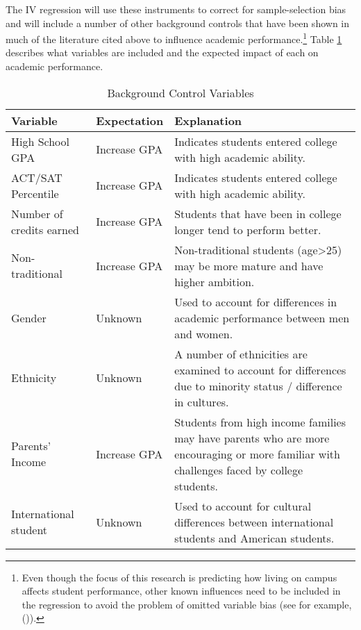 \documentclass[11pt]{article}
\newcommand{\citee}[1]{\citename{#1} (\citeyear{#1})}
\begin{document}
The IV regression will use these instruments to correct for sample-selection bias and will include a number of other background controls that have been shown in much of the literature cited above to influence academic performance.\footnote{Even though the focus of this research is predicting how living on campus affects student performance, other known influences need to be included in the regression to avoid the problem of omitted variable bias (see for example, \citee{trivedi}).}  Table \ref{tb:IV} describes what variables are included and the expected impact of each on academic performance.

\begin{table}[h!] \caption{Background Control Variables} \label{tb:IV}
\begin{center}
\begin{tabular}{llp{3in}} \hline \hline
\textbf{Variable} & \textbf{Expectation} & \textbf{Explanation} \\ \hline \hline
High School GPA & Increase GPA & Indicates students entered college with high academic ability. \\ \hline
ACT/SAT Percentile & Increase GPA & Indicates students entered college with high academic ability. \\ \hline
Number of credits earned & Increase GPA & Students that have been in college longer tend to perform better. \\ \hline
Non-traditional & Increase GPA & Non-traditional students (age>25) may be more mature and have higher ambition. \\ \hline
Gender & Unknown & Used to account for differences in academic performance between men and women. \\ \hline
Ethnicity & Unknown & A number of ethnicities are examined to account for differences due to minority status / difference in cultures. \\ \hline
Parents' Income & Increase GPA & Students from high income families may have parents who are more encouraging or more familiar with challenges faced by college students. \\ \hline
International student & Unknown & Used to account for cultural differences between international students and American students. \\ \hline \hline
\end{tabular}
\end{center}
\end{table}
\end{document}
